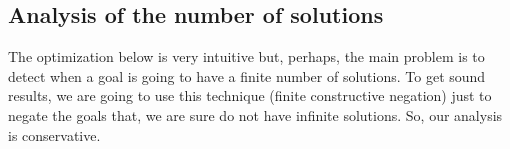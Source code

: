 \documentclass{tlp}
\newtheorem{definition}{Definition} %
\newcommand{\entails}{\models}
\newcommand{\vecy}{\overline{y}}
\begin{document}






\vspace{-0.1in}

\subsection{Analysis of the number of solutions}
\label{cneg:finite_analysis}

The optimization below is very intuitive but, perhaps, the main
problem is to detect when a goal is going to have a finite number of
solutions. To get sound results, we are going to use this technique
(finite constructive negation) just to negate the goals that, we are
sure do not have infinite solutions. So, our analysis is conservative.
\end{document}
